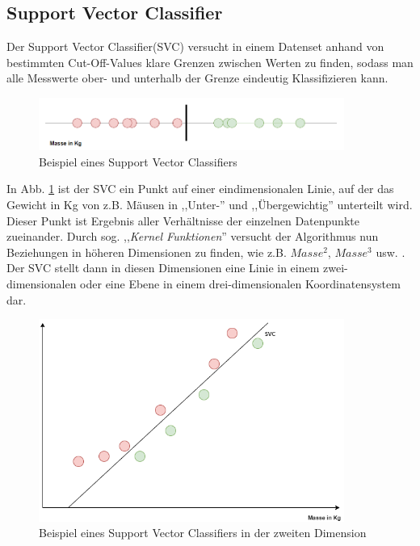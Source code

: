 \subsection{Support Vector Classifier}
Der Support Vector Classifier(SVC) versucht in einem Datenset anhand von bestimmten Cut-Off-Values klare Grenzen 
zwischen Werten zu finden, sodass man alle Messwerte ober- und unterhalb der Grenze eindeutig Klassifizieren 
kann.

\begin{figure}[h]
    \centering
    \includegraphics[width=10.0cm]{pic/SVC_1D.png}
    \caption{Beispiel eines Support Vector Classifiers}
    \label{fig:SVC_1D}
\end{figure}

In Abb. \ref{fig:SVC_1D} ist der SVC ein Punkt auf einer eindimensionalen Linie, auf der das Gewicht in Kg von z.B. 
Mäusen in ,,Unter-'' und ,,Übergewichtig'' unterteilt wird. Dieser Punkt ist Ergebnis aller Verhältnisse der einzelnen
Datenpunkte zueinander. Durch sog. ,,\textit{Kernel Funktionen}'' versucht der Algorithmus nun Beziehungen 
in höheren Dimensionen zu finden, wie z.B. $Masse^2$, $Masse^3$ usw. . Der SVC stellt dann in diesen Dimensionen 
eine Linie in einem zwei-dimensionalen oder eine Ebene in einem drei-dimensionalen Koordinatensystem dar.\\

\begin{figure}[h]
    \centering
    \includegraphics[width=10.0cm]{pic/SVC_2D.png}
    \caption{Beispiel eines Support Vector Classifiers in der zweiten Dimension}
    \label{fig:SVC_2D}
\end{figure}

